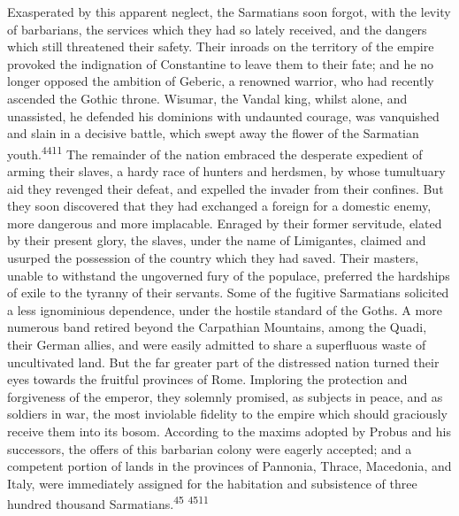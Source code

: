 Exasperated by this apparent neglect, the Sarmatians soon forgot,
with the levity of barbarians, the services which they had so
lately received, and the dangers which still threatened their
safety. Their inroads on the territory of the empire provoked the
indignation of Constantine to leave them to their fate; and he no
longer opposed the ambition of Geberic, a renowned warrior, who
had recently ascended the Gothic throne. Wisumar, the Vandal
king, whilst alone, and unassisted, he defended his dominions
with undaunted courage, was vanquished and slain in a decisive
battle, which swept away the flower of the Sarmatian youth.\textsuperscript{4411}
The remainder of the nation embraced the desperate expedient of
arming their slaves, a hardy race of hunters and herdsmen, by
whose tumultuary aid they revenged their defeat, and expelled the
invader from their confines. But they soon discovered that they
had exchanged a foreign for a domestic enemy, more dangerous and
more implacable. Enraged by their former servitude, elated by
their present glory, the slaves, under the name of Limigantes,
claimed and usurped the possession of the country which they had
saved. Their masters, unable to withstand the ungoverned fury of
the populace, preferred the hardships of exile to the tyranny of
their servants. Some of the fugitive Sarmatians solicited a less
ignominious dependence, under the hostile standard of the Goths.
A more numerous band retired beyond the Carpathian Mountains,
among the Quadi, their German allies, and were easily admitted to
share a superfluous waste of uncultivated land. But the far
greater part of the distressed nation turned their eyes towards
the fruitful provinces of Rome. Imploring the protection and
forgiveness of the emperor, they solemnly promised, as subjects
in peace, and as soldiers in war, the most inviolable fidelity to
the empire which should graciously receive them into its bosom.
According to the maxims adopted by Probus and his successors, the
offers of this barbarian colony were eagerly accepted; and a
competent portion of lands in the provinces of Pannonia, Thrace,
Macedonia, and Italy, were immediately assigned for the
habitation and subsistence of three hundred thousand Sarmatians.\textsuperscript{45} \textsuperscript{4511}


